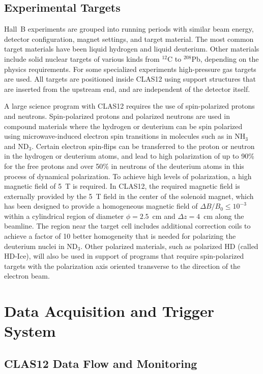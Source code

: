 \documentclass[final,3p,twocolumn]{elsarticle}
\begin{document}
\subsection{Experimental Targets}

Hall~B experiments are grouped into running periods with similar beam energy, detector configuration, magnet
settings, and target material. The most common target materials have been liquid hydrogen and liquid deuterium.
Other materials include solid nuclear targets of various kinds from $^{12}$C to $^{208}$Pb, depending on the physics
requirements. For some specialized experiments high-pressure gas targets are used. All targets are positioned
inside CLAS12 using support structures that are inserted from the upstream end, and are independent of the
detector itself. 

A large science program with CLAS12 requires the use of spin-polarized protons and neutrons. Spin-polarized
protons and polarized neutrons are used in compound materials where the hydrogen or deuterium can be spin
polarized using microwave-induced electron spin transitions in molecules such as in NH$_3$ and ND$_3$. Certain
electron spin-flips can be transferred to the proton or neutron in the hydrogen or deuterium atoms, and lead to high
polarization of up to 90\% for the free protons and over 50\% in neutrons of the deuterium atoms in this process
of dynamical polarization. To achieve high levels of polarization, a high magnetic field of 5~T is required. In CLAS12,
the required magnetic field is externally provided by the 5~T field in the center of the solenoid magnet, which has
been designed to provide a homogeneous magnetic field of $\Delta B / B_0 \leq 10^{-3}$ within a cylindrical region
of diameter $\phi = 2.5$~cm and $\Delta{z} = 4$~cm along the beamline.  The region near the target cell includes
additional correction coils to achieve a factor of 10 better homogeneity that is needed for polarizing the deuterium
nuclei in ND$_3$. Other polarized materials, such as polarized HD (called HD-Ice), will also be used in support of
programs that require spin-polarized targets with the polarization axis oriented transverse to the direction of the
electron beam.        

\section{Data Acquisition and Trigger System} 

\subsection {CLAS12 Data Flow and Monitoring} 
\end{document}
